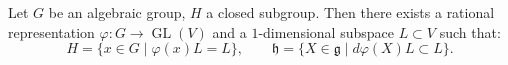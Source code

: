 Let $G$ be an algebraic group, $H$ a closed subgroup. Then there exists a rational representation $\varphi: G \to \operatorname{GL}(V)$ and a $1$-dimensional subspace $L \subset V$ such that:
$$H = \{x \in G \mid \varphi(x)L = L\}, \qquad \mathfrak{h} = \{X \in \mathfrak{g} \mid d\varphi(X)L \subset L\}.$$
